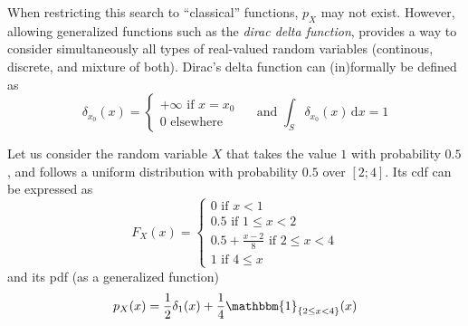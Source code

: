 \documentclass[../../Main_ManuscritThese.tex]{subfiles}
\begin{document}
\begin{definition}
\begin{itemize}
  \end{itemize}
\end{definition}
\begin{remark}
  When restricting this search to ``classical'' functions, $p_X$ may not exist. However, allowing generalized functions such as the \emph{dirac delta function}, provides a way to consider simultaneously all types of real-valued random variables (continous, discrete, and mixture of both). Dirac's delta function can (in)formally be defined as
  \begin{equation}
    \label{eq:def_dirac_delta}
    \delta_{x_0}(x) = 
    \begin{cases}
      +\infty \text{ if } x=x_0 \\
      0 \text{ elsewhere}
    \end{cases} \quad \text{ and }
    \int_S \delta_{x_0}(x)\,\mathrm{d}x = 1
  \end{equation}
\end{remark}
\begin{example}
  \label{ex:X_rv}
  Let us consider the random variable $X$ that takes the value $1$ with probability $0.5$, and follows a uniform distribution with probability $0.5$ over $[2;4]$. Its cdf can be expressed as
  \begin{equation}
    F_X(x) =
    \begin{cases}
      0 \text{ if } x < 1 \\
      0.5 \text{ if } 1 \leq x < 2 \\
      0.5 + \frac{x-2}{8} \text{ if } 2 \leq x < 4 \\
      1 \text{ if } 4 \leq x
    \end{cases}
  \end{equation}
  and its pdf (as a generalized function)
  \begin{equation}
    p_X(x) = \frac{1}{2}\delta_{1}(x) + \frac{1}{4}\mathbbm{1}_{\{2\leq x < 4\}}(x) 
  \end{equation}
\end{example}
\end{document}
